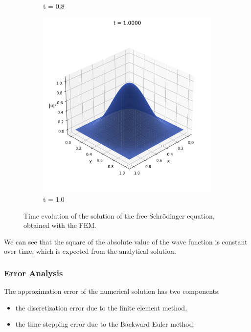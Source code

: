 \documentclass{article}
\theoremstyle{definition}
\theoremstyle{plain}
\theoremstyle{remark}
\begin{document}
\begin{figure}[h]
\begin{subfigure}[b]{0.3\textwidth}
    \caption{t = 0.8}
  \end{subfigure}
  \hfill
  \begin{subfigure}[b]{0.3\textwidth}
    \centering
    \includegraphics[width=\textwidth, trim=0cm 0cm 0cm 1cm, clip]{figures/fem_frame_0100.png}
    \caption{t = 1.0}
  \end{subfigure}
  \caption{Time evolution of the solution of the free Schrödinger equation, obtained with the FEM.}
  \label{fig:free_solution_evolution}
\end{figure}

We can see that the square of the absolute value of the wave function is constant over time, which is expected from the analytical solution.

\subsubsection*{Error Analysis}

The approximation error of the numerical solution has two components: 

\begin{itemize}
  \item the discretization error due to the finite element method,
  \item the time-stepping error due to the Backward Euler method.
\end{itemize}
\end{document}
